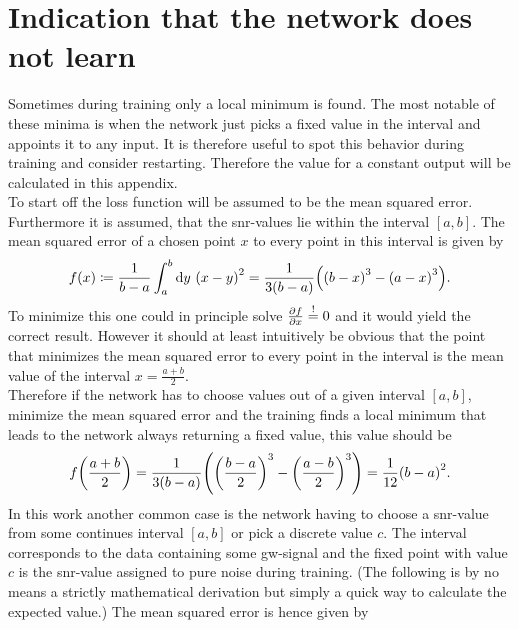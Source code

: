 \section{Indication that the network does not learn}\label{app:network_does_not_learn}
Sometimes during training only a local minimum is found. The most notable of these minima is when the network just picks a fixed value in the interval and appoints it to any input. It is therefore useful to spot this behavior during training and consider restarting. Therefore the value for a constant output will be calculated in this appendix.
\medskip\\
To start off the loss function will be assumed to be the mean squared error. Furthermore it is assumed, that the \gls{snr}-values lie within the interval $\left[a,b\right]$. The mean squared error of a chosen point $x$ to every point in this interval is given by
\begin{equation}
f(x)\coloneqq\frac{1}{b-a}\int_a^b\diff y\ \lr{x-y}^2=\frac{1}{3\lr{b-a}}\lr{\lr{b-x}^3-\lr{a-x}^3}.
\end{equation}
To minimize this one could in principle solve $\frac{\partial f}{\partial x}\overset{!}{=} 0$ and it would yield the correct result. However it should at least intuitively be obvious that the point that minimizes the mean squared error to every point in the interval is the mean value of the interval $x=\frac{a+b}{2}$.\\
Therefore if the network has to choose values out of a given interval $\left[a,b\right]$, minimize the mean squared error and the training finds a local minimum that leads to the network always returning a fixed value, this value should be
\begin{equation}
f{\left( \frac{a+b}{2} \right)}=\frac{1}{3{\left( b-a \right)}}{\left( {\left( \frac{b-a}{2} \right)}^3-{\left( \frac{a-b}{2} \right)}^3 \right)}=\frac{1}{12}{\left( b-a \right)}^2.
\end{equation}
In this work another common case is the network having to choose a \gls{snr}-value from some continues interval $\left[a,b\right]$ or pick a discrete value $c$. The interval corresponds to the data containing some \gls{gw}-signal and the fixed point with value $c$ is the \gls{snr}-value assigned to pure noise during training. (The following is by no means a strictly mathematical derivation but simply a quick way to calculate the expected value.) The mean squared error is hence given by
